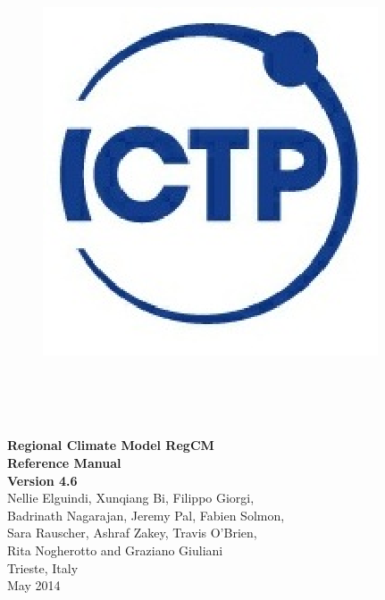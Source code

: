 \documentclass[10pt,twoside,a4paper]{report}
\begin{document}
\begin{titlepage}

\begin{figure}
\vspace{-35pt}
\begin{center}
\includegraphics{ICTP_logo}
\end{center}
\end{figure}

\\
 \\
 \\

\vspace{3cm}

\begin{boxedminipage}{\textwidth}
\begin{center}
\vspace{0.5cm}
{\Large
{\bf Regional Climate Model RegCM\\Reference Manual} \\
\vspace{0.2cm}
{\bf Version 4.6}}\\
\vspace{0.5cm}
Nellie Elguindi, Xunqiang Bi, Filippo Giorgi,\\
Badrinath Nagarajan, Jeremy Pal, Fabien Solmon,\\
Sara Rauscher, Ashraf Zakey, Travis O'Brien,\\
Rita Nogherotto and Graziano Giuliani\\
Trieste, Italy\\May 2014
\vspace{0.5cm}
\end{center}
\end{boxedminipage}

\end{titlepage}

\cleardoublepage

\cleardoublepage
\tableofcontents
\cleardoublepage

\listoffigures
\listoftables
\cleardoublepage











\end{document}
